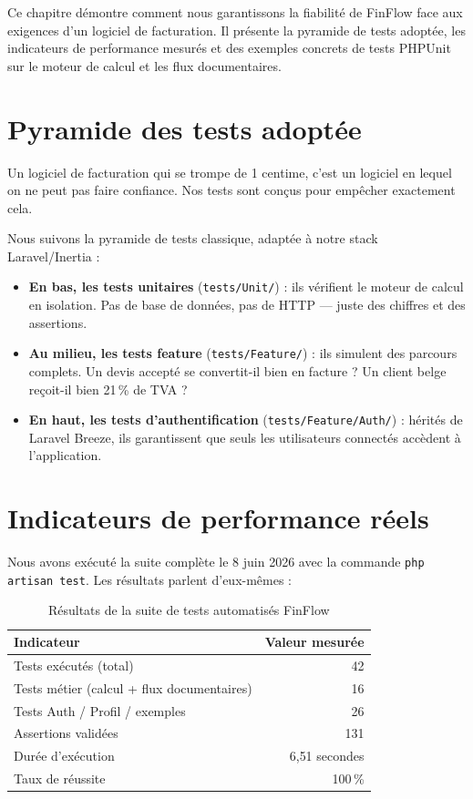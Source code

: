 \documentclass[12pt,a4paper]{report}
\begin{document}
Ce chapitre démontre comment nous garantissons la fiabilité de FinFlow face aux exigences d'un logiciel de facturation. Il présente la pyramide de tests adoptée, les indicateurs de performance mesurés et des exemples concrets de tests PHPUnit sur le moteur de calcul et les flux documentaires.

\section{Pyramide des tests adoptée}

Un logiciel de facturation qui se trompe de 1 centime, c'est un logiciel en lequel on ne peut pas faire confiance. Nos tests sont conçus pour empêcher exactement cela.

Nous suivons la pyramide de tests classique, adaptée à notre stack Laravel/Inertia :

\begin{itemize}[leftmargin=*]
    \item \textbf{En bas, les tests unitaires} (\texttt{tests/Unit/}) : ils vérifient le moteur de calcul en isolation. Pas de base de données, pas de HTTP --- juste des chiffres et des assertions.
    \item \textbf{Au milieu, les tests feature} (\texttt{tests/Feature/}) : ils simulent des parcours complets. Un devis accepté se convertit-il bien en facture ? Un client belge reçoit-il bien 21\,\% de TVA ?
    \item \textbf{En haut, les tests d'authentification} (\texttt{tests/Feature/Auth/}) : hérités de Laravel Breeze, ils garantissent que seuls les utilisateurs connectés accèdent à l'application.
\end{itemize}

\section{Indicateurs de performance réels}

Nous avons exécuté la suite complète le 8 juin 2026 avec la commande \texttt{php artisan test}. Les résultats parlent d'eux-mêmes :

\begin{table}[H]
\centering
\caption{Résultats de la suite de tests automatisés FinFlow}
\begin{tabular}{@{}lr@{}}
\toprule
\textbf{Indicateur} & \textbf{Valeur mesurée} \\
\midrule
Tests exécutés (total) & 42 \\
Tests métier (calcul + flux documentaires) & 16 \\
Tests Auth / Profil / exemples & 26 \\
Assertions validées & 131 \\
Durée d'exécution & 6{,}51 secondes \\
Taux de réussite & 100\,\% \\
\bottomrule
\end{tabular}
\end{table}
\end{document}
